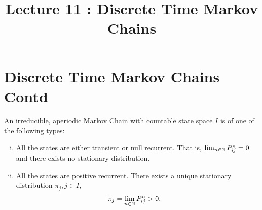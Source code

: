 \documentclass[a4paper,10pt,english]{article}
\title{Lecture 11 : Discrete Time Markov Chains}
\author{}
\begin{document}
\maketitle
\section{Discrete Time Markov Chains Contd}
\begin{thm}
An irreducible, aperiodic Markov Chain with countable state space $I$ is of one of the following types:
\begin{enumerate}[i)]
\item All the states are either transient or null recurrent. That is, $\lim_{n \in \mathbb{N}}P_{ij}^n = 0$  and there exists no stationary distribution.
\item All the states are positive recurrent. There exists a unique stationary distribution ${\pi_j, j \in I}$,
\begin{align*}
 \pi_j &= \lim_{n \in \mathbb{N}} P^n_{ij} > 0.
 \end{align*}
\end{enumerate}
\end{thm}
\end{document}
